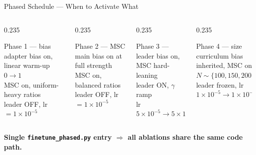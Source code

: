 \documentclass[aspectratio=169,11pt]{beamer}
\begin{document}
\begin{frame}[t]{Phased Schedule --- When to Activate What}
  \vspace{0.30cm}
  \begin{columns}[T,onlytextwidth]
    \begin{column}{0.235\textwidth}
      \begin{block}{Phase 1 --- bias adapter}
        \scriptsize
        bias on, linear warm-up $0\!\to\!1$\\
        MSC on, uniform-heavy ratios\\
        leader OFF, lr $=1\!\times\!10^{-5}$
      \end{block}
    \end{column}
    \hfill
    \begin{column}{0.235\textwidth}
      \begin{block}{Phase 2 --- MSC main}
        \scriptsize
        bias on at full strength\\
        MSC on, balanced ratios\\
        leader OFF, lr $=1\!\times\!10^{-5}$
      \end{block}
    \end{column}
    \hfill
    \begin{column}{0.235\textwidth}
      \begin{block}{Phase 3 --- leader}
        \scriptsize
        bias on, MSC hard-leaning\\
        leader ON, $\gamma$ ramp\\
        lr $5\!\times\!10^{-5}\!\to\!5\!\times\!10^{-6}$
      \end{block}
    \end{column}
    \hfill
    \begin{column}{0.235\textwidth}
      \begin{block}{Phase 4 --- size curriculum}
        \scriptsize
        bias inherited, MSC on\\
        $N\!\sim\!\{100,150,200,250\}$\\
        leader frozen, lr $1\!\times\!10^{-5}\!\to\!1\!\times\!10^{-6}$
      \end{block}
    \end{column}
  \end{columns}

  \vspace{0.10cm}
  {\scriptsize\color{sdmblue}\textbf{Single \texttt{finetune\_phased.py} entry $\Rightarrow$ all ablations share the same code path.}}
\end{frame}
\end{document}
